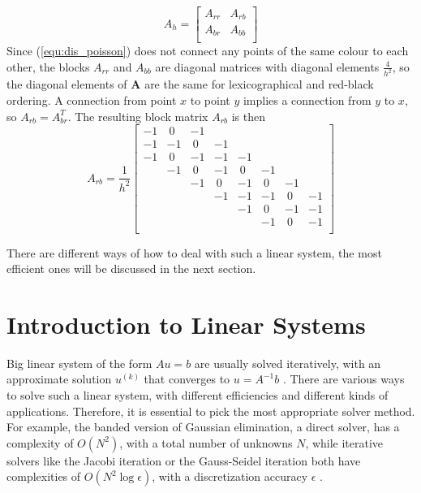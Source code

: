 \begin{equation}
A_h = 
\begin{bmatrix}
A_{rr} & A_{rb}\\
A_{br} & A_{bb}\\
\end{bmatrix}
\end{equation}
Since (\ref{equ:dis_poisson}) does not connect any points of the same colour to each other, the blocks $A_{rr}$ and $A_{bb}$ are diagonal matrices with diagonal elements $\frac{4}{h^2}$, so the diagonal elements of \textbf{A} are the same for lexicographical and red-black ordering. A connection from point $x$ to point $y$ implies a connection from $y$ to $x$, so  $A_{rb} = A_{br}^T$. The resulting block matrix $A_{rb}$ is then \cite{Trottenberg:2000:MUL:374106}
\begin{equation}
A_{rb} = \frac{1}{h^2} 
\begin{bmatrix}
-1 & ~0 & -1 & & & &  & \\
-1 & -1 & ~0 & -1 & & &   & \\
-1 & ~0 & -1 & -1 & -1 &   & \\
   & -1 & ~0 & -1 & ~0 & -1 &    \\
   
   & & -1 & ~0 & -1 & ~0 & -1     \\
   & & & -1 & -1 & -1 & ~0 & -1     \\
     & & & & -1 & ~0 & -1 & -1   \\
       & & & &  & -1 & ~0 & -1  \\
\end{bmatrix}
\end{equation}
 
There are different ways of how to deal with such a linear system, the most efficient ones will be discussed in the next section.

\section{Introduction to Linear Systems}
Big linear system of the form $Au = b$ are usually solved iteratively, with an approximate solution $u^{(k)}$ that converges to $u = A^{-1}b$ \cite{golub1996matrix}. There are various ways to solve such a linear system, with different efficiencies and different kinds of applications. Therefore, it is essential to pick the most appropriate solver method. For example, the banded version of Gaussian elimination, a direct solver, has a complexity of $O(N^2)$, with a total number of unknowns $N$, while iterative solvers like the Jacobi iteration or the Gauss-Seidel iteration both have complexities of $O(N^2 \log \epsilon)$, with a discretization accuracy $\epsilon$ \cite{Trottenberg:2000:MUL:374106}. 

